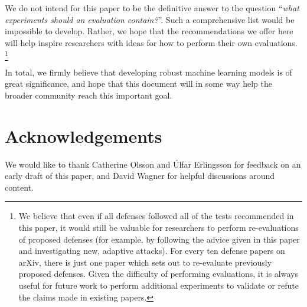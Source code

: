 \documentclass{article} %
\begin{document}
We do not intend for this paper to be the definitive
answer to the question ``\emph{what
experiments should an evaluation contain?}''. Such a comprehensive list would be
impossible to develop.
%
Rather, we hope that
the recommendations we offer here will help inspire researchers
with ideas for how to perform their own evaluations.
%
\footnote{We believe that even if all defenses followed all of the
tests recommended in this paper, it would still be valuable
for researchers to perform re-evaluations of proposed defenses
(for example, by following the advice given in this paper and investigating
new, adaptive attacks).
%
For every ten defense papers on arXiv, there is just one paper which sets
out to re-evaluate previously proposed defenses.
%
Given the difficulty of performing
evaluations, it is always useful for future work to perform additional
experiments to validate or refute the claims made in existing papers.}

In total, we firmly believe that developing robust machine learning models is
of great significance, and hope that this document will in some way help
the broader community reach this important goal.

\section*{Acknowledgements}
We would like to thank Catherine Olsson and {\'U}lfar Erlingsson
for feedback on an early draft of this paper, and David Wagner for
helpful discussions around content.



\end{document}
